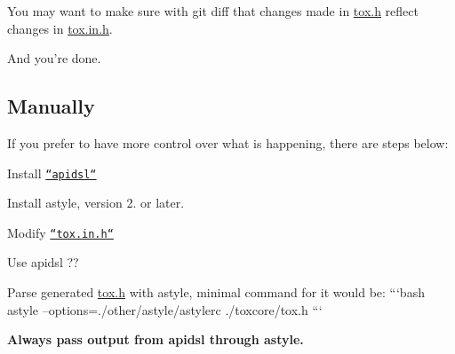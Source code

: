 You may want to make sure with {\ttfamily git diff} that changes made in {\ttfamily \hyperlink{tox_8h_source}{tox.\+h}} reflect changes in {\ttfamily \hyperlink{tox_8in_8h_source}{tox.\+in.\+h}}.

And you're done.

\subsection*{Manually}

If you prefer to have more control over what is happening, there are steps below\+:


\begin{DoxyEnumerate}
\item Install \href{https://github.com/iphydf/apidsl}{\tt ``apidsl``}
\item Install {\ttfamily astyle}, version 2. or later.
\item Modify \href{/other/apidsl/tox.in.h}{\tt ``tox.in.\+h``}
\item Use {\ttfamily apidsl} {\ttfamily ??}
\item Parse generated {\ttfamily \hyperlink{tox_8h_source}{tox.\+h}} with astyle, minimal command for it would be\+: ```bash astyle --options=./other/astyle/astylerc ./toxcore/tox.h ```
\end{DoxyEnumerate}

{\bfseries Always pass output from {\ttfamily apidsl} through astyle.} 